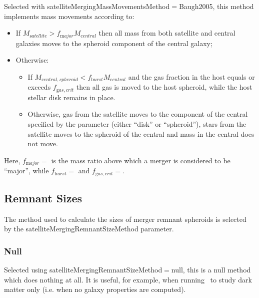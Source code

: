 Selected with {\normalfont \ttfamily satelliteMergingMassMovementsMethod}$=${\normalfont \ttfamily Baugh2005}, this method implements mass movements according to:
\begin{itemize}
 \item If $M_{\mathrm satellite} > f_{\mathrm major} M_{\mathrm central}$ then all mass from both satellite and central galaxies moves to the spheroid \gls{component} of the central galaxy;
 \item Otherwise:
 \begin{itemize}
  \item If $M_{\mathrm central, spheroid} < f_{\mathrm burst} M_{\mathrm central}$ and the gas fraction in the host equals or exceeds $f_{\mathrm gas,crit}$ then all gas is moved to the host spheroid, while the host stellar disk remains in place.
  \item Otherwise, gas from the satellite moves to the \gls{component} of the central specified by the {\normalfont \ttfamily [minorMergerGasMovesTo]} parameter (either ``{\normalfont \ttfamily disk}'' or ``{\normalfont \ttfamily spheroid}''), stars from the satellite moves to the spheroid of the central and mass in the central does not move.
 \end{itemize}
\end{itemize}
Here, $f_{\mathrm major}=${\normalfont \ttfamily [majorMergerMassRatio]} is the mass ratio above which a merger is considered to be ``major'', while $f_{\mathrm burst}=${\normalfont \ttfamily [burstMassRatio]} and $f_{\mathrm gas,crit}=${\normalfont \ttfamily [burstCriticalGasFraction]}.

\subsection{Remnant Sizes}

The method used to calculate the sizes of merger remnant spheroids is selected by the {\normalfont \ttfamily satelliteMergingRemnantSizeMethod} parameter.

\subsubsection{Null}

Selected using {\normalfont \ttfamily satelliteMergingRemnantSizeMethod}$=${\normalfont \ttfamily null}, this is a null method which does nothing at all. It is useful, for example, when running \glc\ to study dark matter only (i.e. when no galaxy properties are computed).


